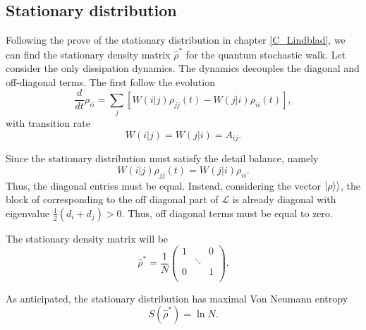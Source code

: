 \subsection{Stationary distribution}

Following the prove of the stationary distribution in chapter \ref{C_Lindblad}, we can find the stationary density matrix $\hat\rho^*$ for the quantum stochastic walk.
Let consider the only dissipation dynamics.
The dynamics decouples the diagonal and off-diagonal terms. The first follow the evolution 
\begin{equation}
    \frac{d}{dt}\rho_{ii} = \sum_j\left[W(i|j)\rho_{jj}(t) - W(j|i)\rho_{ii}(t)\right],
\end{equation}
with transition rate
\begin{equation}
    W(i|j) = W(j|i) = A_{ij}.
\end{equation}

Since the stationary distribution must satisfy the detail balance, namely
\begin{equation}
    W(i|j)\rho_{jj}(t) = W(j|i)\rho_{ii}.
\end{equation}
Thus, the diagonal entries must be equal. 
Instead, considering the vector $\lvert\rho\rangle\rangle$, the block of corresponding to the off diagonal part of $\mathcal{L}$ is already diagonal with eigenvalue $\frac{1}{2}(d_i + d_j)>0$. Thus, off diagonal terms must be equal to zero.

The stationary density matrix will be
\begin{equation}
    \hat\rho^* = \frac{1}{N}\begin{pmatrix}
        1&&0\\
        &\ddots&\\
        0&&1\\
    \end{pmatrix}.
\end{equation}

As anticipated, the stationary distribution has maximal Von Neumann entropy 
\begin{equation}
    S\left(\hat\rho^*\right) = \ln N.
\end{equation}


\begin{comment}
In chapter  we prove that the master equation \eqref{stochastic_lindblad_master} allows a stationary distribution in the form
\begin{equation}
    \rho^* = \frac{1}{Z} e^{-\beta H}
\end{equation}  
with $\beta$ the inverse of the temperature of the thermal bath.
    
Let consider the temperature of bath  decreasing very slowly such that the system is always in thermal equilibrium with the bath. When the temperature tends to zero ($\beta \rightarrow \infty$), the system will reach the final distribution $\hat \rho^* = \frac{1}{N}\;diag(1,...,1)$, where the system has collapsed into the state with zero eigenvalue of the superoperator $\mathcal{L}^{cl}$. The diagonal element give us the probability to found the particle in the respective node and it is the same result we have obtained for the classical random walk.
\end{comment}

